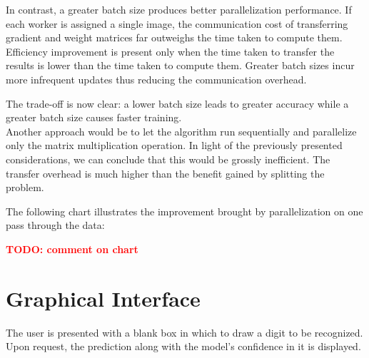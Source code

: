 \documentclass[a4paper]{article}
\newcommand{\TODO}[1]{\noindent \textbf{\textcolor{red}{TODO: #1}}}
\begin{document}
In contrast, a greater batch size produces better parallelization performance. If each worker is assigned a single image, the communication cost of transferring gradient and weight matrices far outweighs the time taken to compute them. Efficiency improvement is present only when the time taken to transfer the results is lower than the time taken to compute them. Greater batch sizes incur more infrequent updates thus reducing the communication overhead.

The trade-off is now clear: a lower batch size leads to greater accuracy while a greater batch size causes faster training.
\\

Another approach would be to let the algorithm run sequentially and parallelize only the matrix multiplication operation. In light of the previously presented considerations, we can conclude that this would be grossly inefficient. The transfer overhead is much higher than the benefit gained by splitting the problem.

The following chart illustrates the improvement brought by parallelization on one pass through the data:

\begin{center}
\end{center}

\TODO{comment on chart}

\newpage
\section{Graphical Interface}
The user is presented with a blank box in which to draw a digit to be recognized. Upon request, the prediction along with the model's confidence in it is displayed. 
\end{document}
